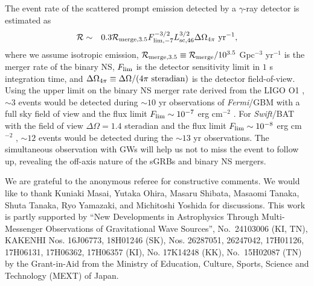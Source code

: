 \documentclass{emulateapj}
\begin{document}
The event rate of the scattered prompt emission 
detected by a $\gamma$-ray detector is estimated as 
\begin{eqnarray}\label{eq:rate}
{\cal R}&\sim&0.3{\cal R}_{\rm merge,3.5}F_{\rm lim,-7}^{-3/2}L_{\rm sc,46}^{3/2}\Delta\Omega_{4\pi}~{\rm yr}^{-1},
\end{eqnarray}
where we assume isotropic emission,
${\cal R}_{\rm merge,3.5}\equiv{\cal R}_{\rm merge}/10^{3.5}$ Gpc$^{-3}$ yr$^{-1}$ 
is the merger rate of the binary NS, 
$F_{\rm lim}$ is the detector sensitivity limit in $1$ s integration time, 
and $\Delta\Omega_{4\pi}\equiv\Delta\Omega/(4\pi~{\rm steradian})$ is the detector field-of-view. 
Using the upper limit on the binary NS merger rate derived from the LIGO O1
\citep[$\sim3\times10^{3}$ yr$^{-1}$ Gpc$^{-3}$; ][]{2016ApJ...832L..21A}, 
$\sim3$ events would be detected during $\sim10$ yr observations of {\it Fermi}/GBM with a full sky field of view 
and the flux limit $F_{\rm lim}\sim10^{-7}$ erg cm$^{-2}$ \citep{2016ApJS..223...28N}. 
For {\it Swift}/BAT with
the field of view $\Delta\Omega=1.4$ steradian 
and the flux limit $F_{\rm lim}\sim10^{-8}$ erg cm$^{-2}$ \citep{2013ApJS..209...14K}, 
$\sim12$ events would be detected during the $\sim 13$ yr observations. 
The simultaneous observation with GWs will help us not to miss the event to follow up,
revealing the off-axis nature of the sGRBs and binary NS mergers.

\acknowledgments

We are grateful to the anonymous referee for constructive comments.
We would like to thank Kuniaki Masai, Yutaka Ohira, 
Masaru Shibata, Masaomi Tanaka, Shuta Tanaka, Ryo Yamazaki, and Michitoshi Yoshida for discussions.
This work is partly supported by
``New Developments in Astrophysics Through Multi-Messenger Observations
of Gravitational Wave Sources'', No.~24103006 (KI, TN), 
KAKENHI Nos. 16J06773, 18H01246 (SK), Nos. 26287051, 26247042, 17H01126, 17H06131, 17H06362, 17H06357 (KI),
No. 17K14248 (KK), No.~15H02087 (TN)
by the Grant-in-Aid from the Ministry of Education, Culture, Sports,
Science and Technology (MEXT) of Japan.




\end{document}
